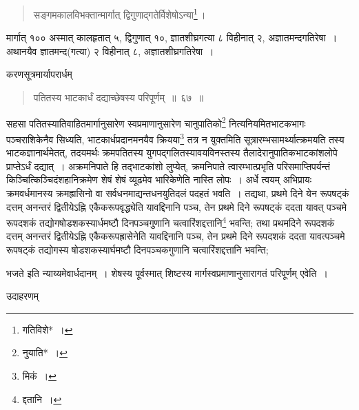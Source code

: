 \documentclass[10pt, openany]{book}
\begin{document}
{{{{{\begin{quote}

{\bs सङ्गमकालविभक्तान्मार्गात् द्विगुणाद्गतेर्विशेषोऽन्या\renewcommand{\thefootnote}{\s ३}\footnote{\s *गतिविशे*~।}\,।}
\end{quote}

{मार्गात् १०० अस्मात् कालहृतात् ५, द्विगुणात् १०, ज्ञातशीघ्रगत्या ८
विहीनात्}
{२, अज्ञातमन्दगतिरेषा~। अथानयैव ज्ञातमन्द(गत्या) २ विहीनात् ८,
अज्ञातशीघ्रगतिरेषा~।}
\vspace{3mm}

{करणसूत्रमार्यापरार्धम्\textemdash}

\begin{quote}

{\bs पतितस्य भाटकार्धं दद्याच्छेषस्य परिपूर्णम्~॥~६७~॥}
\end{quote}

{सहसा पतितस्यातिवाहितमार्गानुसारेण स्वप्रमाणानुसारेण चानुपातिको\renewcommand{\thefootnote}{\s ४}\footnote{\s *नुयाति*~।}
नित्यनियमितभाटकभागः पञ्चराशिकेनैव सिध्यति, भाटकार्धप्रदानमनयैव क्रियया\renewcommand{\thefootnote}{\s ५}\footnote{\s मिकं~।} तत्र न  युक्तमिति सूत्रारम्भसामर्थ्यात्क्रमयति तस्य भाटकज्ञानार्थमेतत्, तदयमर्थः
क्रमपतितस्य युगपद्गलितस्यावयविनस्तस्य तैलादेरानुपातिकभाटकांशलोपे प्राप्तेऽर्धं दद्यात्~। अक्रमनिपाते
हि तद्भाटकांशो लुप्येत्,}
{क्रमनिपाते त्वारम्भात्प्रभृति परिसमाप्तिपर्यन्तं
किञ्चित्किञ्चिदंशहानिक्रमेण शेषं शेषं व्यूढमेव}
{भारिकेणेति नास्ति लोपः~। अर्धे त्वयम् अभिप्रायः क्रमवर्धमानस्य
क्रमह्रासिनो वा सर्वधनमाद्यन्तधनयुतिदलं पदहतं भवति~। तद्यथा, प्रथमे दिने येन रूपषट्कं दत्तम् अनन्तरं
द्वितीयेऽह्नि एकैकरूपवृद्ध्येति}
{यावद्दिनानि पञ्च, तेन प्रथमे दिने रूपषट्कं ददता यावत् पञ्चमे रूपदशकं
तद्योगषोडशकस्यार्धमष्टौ दिनपञ्चगुणानि चत्वारिंशद्दत्तानि\renewcommand{\thefootnote}{\s ६}\footnote{\s *द्दतानि~।} भवन्ति; तथा प्रथमदिने
रूपदशकं दत्तम् अनन्तरं}
{द्वितीयेऽह्नि एकैकरूपह्रासेनेति यावद्दिनानि पञ्च, तेन प्रथमे दिने
रूपदशकं ददता यावत्पञ्चमे रूपषट्कं तद्योगस्य षोडशकस्यार्घमष्टौ दिनपञ्चकगुणानि चत्वारिंशद्दत्तानि
भवन्ति;}


\newpage

{भजते इति न्याय्यमेवार्धदानम्~। शेषस्य पूर्वस्मात् शिष्टस्य
मार्गस्वप्रमाणानुसारागतं परिपूर्णम् एवेति~।}

\vspace{3mm}
{उदाहरणम्\textemdash}

\begin{quote}
    

\end{quote}}}}}}
\end{document}
